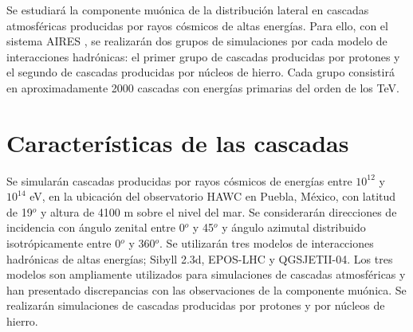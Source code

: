 
Se estudiar\'a la componente mu\'onica de la distribuci\'on lateral en cascadas atmosf\'ericas producidas por rayos c\'osmicos de altas energ\'ias. Para ello, con el sistema AIRES \cite{Sciutto1999a}, se realizar\'an dos grupos de simulaciones por cada modelo de interacciones hadr\'onicas: el primer grupo de cascadas producidas por protones y el segundo de cascadas producidas por n\'ucleos de hierro. Cada grupo consistir\'a en aproximadamente 2000 cascadas con energ\'ias primarias del orden de los TeV.

\section{Características de las cascadas}
Se simular\'an cascadas producidas por rayos cósmicos de energías entre $10^{12}$ y $10^{14}$ eV, en la ubicaci\'on del observatorio HAWC en Puebla, M\'exico, con latitud de 19$^{o}$ y altura de 4100 m sobre el nivel del mar. Se considerar\'an direcciones de incidencia con ángulo zenital entre 0$^{o}$ y 45$^{o}$ y ángulo azimutal distribuido isotrópicamente entre 0$^{o}$ y 360$^{o}$. Se utilizar\'an tres modelos de interacciones hadrónicas de altas energías; Sibyll 2.3d, EPOS-LHC y QGSJETII-04. Los tres modelos son ampliamente utilizados para simulaciones de cascadas atmosf\'ericas y han presentado discrepancias con las observaciones de la componente mu\'onica. Se realizar\'an simulaciones de cascadas producidas por protones y por n\'ucleos de hierro. \\
	 
